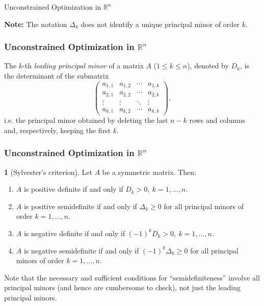 \documentclass[10pt]{beamer}
\theoremstyle{definition}
\newtheorem{Fact}{\translate{Fact}}
\begin{document}
\begin{section}{Unconstrained Optimization in $ \mathbb{R}^n $}
\begin{frame}[fragile]
\textbf{Note:} The notation $ \Delta_k $ does not identify a unique  principal minor of order $ k $.
\end{frame}

\begin{frame}[fragile]
\frametitle{Unconstrained Optimization in $ \mathbb{R}^n $}
The $ k $-th \emph{leading principal minor} of a matrix $ A $ ($ 1\leq k \leq n $), denoted by $ D_k $, is the determinant of the submatrix \[  \begin{pmatrix}
a_{1,1} & a_{1,2} & \cdots & a_{1,k}\\
a_{2,1} & a_{2,2} & \cdots & a_{2,k}\\
\vdots&\vdots& \ddots& \vdots\\
a_{k,1} & a_{k,2} & \cdots & a_{k,k}
\end{pmatrix} , \]
i.e. the principal minor obtained by deleting the last $ n-k $ rows and columns and, respectively, keeping the first $ k $.

\end{frame}

\begin{frame}[fragile]
\frametitle{Unconstrained Optimization in $ \mathbb{R}^n $}
\begin{Fact}[Sylvester's criterion]
Let $ A $ be a symmetric matrix. Then:
\begin{enumerate}
\item $ A $ is positive definite if and only if $ D_k >0,~k=1,\ldots,n $.
\item $ A $ is positive semidefinite if and only if $ \Delta_k \geq 0 $ for all principal minors of order $ k = 1,\ldots,n $.
\item $ A $ is negative definite if and only if $ (-1)^k D_k >0,~k=1,\ldots,n $.
\item $ A $ is negative semidefinite if and only if $ (-1)^k \Delta_k \geq 0 $ for all principal minors of order $ k = 1,\ldots,n $.
\end{enumerate}
\label{fc:Sylvester}
\end{Fact}

Note that the necessary and sufficient conditions for ``semidefiniteness'' involve all principal minors (and hence are cumbersome to check), not just the leading principal minors.
\end{frame}


\end{section}
\end{document}
